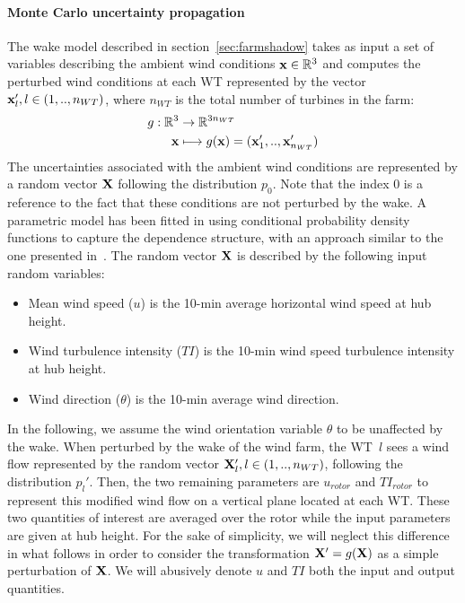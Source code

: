 \paragraph{Monte Carlo uncertainty propagation}
The wake model described in section~\ref{sec:farmshadow} takes as input a set of variables describing the ambient wind conditions ${\bf x} \in \mathbb{R}^3$ and computes the perturbed wind conditions at each WT represented by the vector ${\bf x} _l', l \in (1,..,n_{WT})$, where $n_{WT}$ is the total number of turbines in the farm:
\begin{align}
    g:\mathbb{R}^3 &\rightarrow \mathbb{R}^{3 n_{WT}} \\
    {\bf x} &\longmapsto g({\bf x}) = ({\bf x}_1',..,{\bf x}_{n_{WT}}')
\end{align}
The uncertainties associated with the ambient wind conditions are represented by a random vector ${\bf X}$ following the distribution $p_0$. 
Note that the index 0 is a reference to the fact that these conditions are not perturbed by the wake. 
A parametric model has been fitted in \cite{vanem_fekhari_2023} using conditional probability density functions to capture the dependence structure, with an approach similar to the one presented in~\cite{kelly_2022}. 
The random vector ${\bf X}$ is described by the following input random variables:
\begin{itemize}
    \item Mean wind speed ($u$) is the 10-min average horizontal wind speed at hub height.
    \item Wind turbulence intensity ($TI$) is the 10-min wind speed turbulence intensity at hub height.
    \item Wind direction ($\theta$) is the 10-min average wind direction.
\end{itemize}
In the following, we assume the wind orientation variable $\theta$ to be unaffected by the wake. 
When perturbed by the wake of the wind farm, the WT~$l$ sees a wind flow represented by the random vector ${\bf X}_l',l \in (1,..,n_{WT})$, following the distribution $p_l'$. 
Then, the two remaining parameters are $u_{rotor}$ and $TI_{rotor}$ to represent this modified wind flow on a vertical plane located at each WT. 
These two quantities of interest are averaged over the rotor while the input parameters are given at hub height. For the sake of simplicity, we will neglect this difference in what follows in order to consider the transformation ${\bf X}'=g({\bf X})$ as a simple perturbation of ${\bf X}$. We will abusively denote $u$ and $TI$ both the input and output quantities. 
